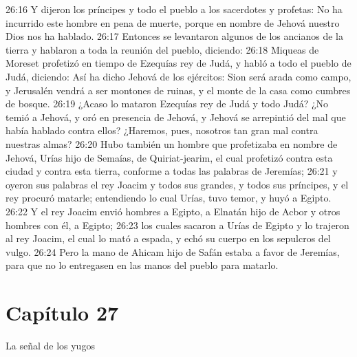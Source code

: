 26:16 Y dijeron los príncipes y todo el pueblo a los sacerdotes y profetas: No ha incurrido este hombre en pena de muerte, porque en nombre de Jehová nuestro Dios nos ha hablado. 
26:17 Entonces se levantaron algunos de los ancianos de la tierra y hablaron a toda la reunión del pueblo, diciendo: 
26:18 Miqueas de Moreset profetizó en tiempo de Ezequías rey de Judá, y habló a todo el pueblo de Judá, diciendo: Así ha dicho Jehová de los ejércitos: Sion será arada como campo, y Jerusalén vendrá a ser montones de ruinas, y el monte de la casa como cumbres de bosque. 
26:19 ¿Acaso lo mataron Ezequías rey de Judá y todo Judá? ¿No temió a Jehová, y oró en presencia de Jehová, y Jehová se arrepintió del mal que había hablado contra ellos? ¿Haremos, pues, nosotros tan gran mal contra nuestras almas? 
26:20 Hubo también un hombre que profetizaba en nombre de Jehová, Urías hijo de Semaías, de Quiriat-jearim, el cual profetizó contra esta ciudad y contra esta tierra, conforme a todas las palabras de Jeremías; 
26:21 y oyeron sus palabras el rey Joacim y todos sus grandes, y todos sus príncipes, y el rey procuró matarle; entendiendo lo cual Urías, tuvo temor, y huyó a Egipto. 
26:22 Y el rey Joacim envió hombres a Egipto, a Elnatán hijo de Acbor y otros hombres con él, a Egipto; 
26:23 los cuales sacaron a Urías de Egipto y lo trajeron al rey Joacim, el cual lo mató a espada, y echó su cuerpo en los sepulcros del vulgo. 
26:24 Pero la mano de Ahicam hijo de Safán estaba a favor de Jeremías, para que no lo entregasen en las manos del pueblo para matarlo. 

\section*{Capítulo 27 }
La señal de los yugos 
 
